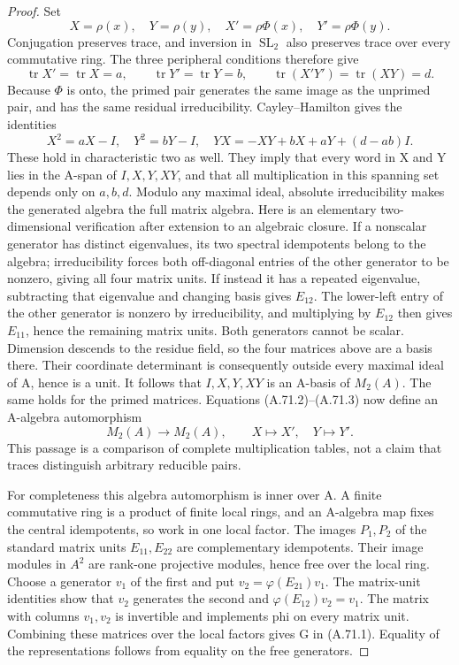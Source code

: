 \begin{proof}
Set
\[
 X=\rho(x),\quad Y=\rho(y),\quad
 X'=\rho\Phi(x),\quad Y'=\rho\Phi(y).
\]
Conjugation preserves trace, and inversion in \(\operatorname{SL}_2\)
also preserves trace over every commutative ring. The three
peripheral conditions therefore give
\[
 \operatorname{tr}X'=\operatorname{tr}X=a,\qquad
 \operatorname{tr}Y'=\operatorname{tr}Y=b,\qquad
 \operatorname{tr}(X'Y')=\operatorname{tr}(XY)=d.
 \tag{A.71.2}
\]
Because \(\Phi\) is onto, the primed pair generates the same image as
the unprimed pair, and has the same residual irreducibility.
Cayley--Hamilton gives the identities
\[
 X^2=aX-I,\quad Y^2=bY-I,\quad
 YX=-XY+bX+aY+(d-ab)I.
 \tag{A.71.3}
\]
These hold in characteristic two as well. They imply that every
word in X and Y lies in the A-span of \(I,X,Y,XY\), and that
all multiplication in this spanning set depends only on
\(a,b,d\). Modulo any maximal ideal, absolute irreducibility
makes the generated algebra the full matrix algebra. Here is an
elementary two-dimensional verification after extension to an
algebraic closure. If a nonscalar generator has distinct
eigenvalues, its two spectral idempotents belong to the algebra;
irreducibility forces both off-diagonal entries of the other
generator to be nonzero, giving all four matrix units. If instead
it has a repeated eigenvalue, subtracting that eigenvalue and
changing basis gives \(E_{12}\). The lower-left entry of the
other generator is nonzero by irreducibility, and multiplying
by \(E_{12}\) then gives \(E_{11}\), hence the remaining
matrix units. Both generators cannot be scalar. Dimension
descends to the residue field, so the four matrices above are
a basis there.
Their coordinate determinant is consequently outside every
maximal ideal of A, hence is a unit. It follows that
\(I,X,Y,XY\) is an A-basis of \(M_2(A)\). The same holds
for the primed matrices. Equations (A.71.2)--(A.71.3) now define
an A-algebra automorphism
\[
 M_2(A)\longrightarrow M_2(A),\qquad X\mapsto X',\quad Y\mapsto Y'.
\]
This passage is a comparison of complete multiplication tables,
not a claim that traces distinguish arbitrary reducible pairs.

For completeness this algebra automorphism is inner over A.
A finite commutative ring is a product of finite local rings,
and an A-algebra map fixes the central idempotents, so work in
one local factor. The images \(P_1,P_2\) of the standard
matrix units \(E_{11},E_{22}\) are complementary idempotents.
Their image modules in \(A^2\) are rank-one projective
modules, hence free over the local ring. Choose a generator
\(v_1\) of the first and put \(v_2=\varphi(E_{21})v_1\).
The matrix-unit identities show that \(v_2\) generates the
second and \(\varphi(E_{12})v_2=v_1\). The matrix with columns
\(v_1,v_2\) is invertible and implements phi on every matrix
unit. Combining these matrices over the local factors gives
G in (A.71.1). Equality of the representations follows from
equality on the free generators.


\end{proof}
